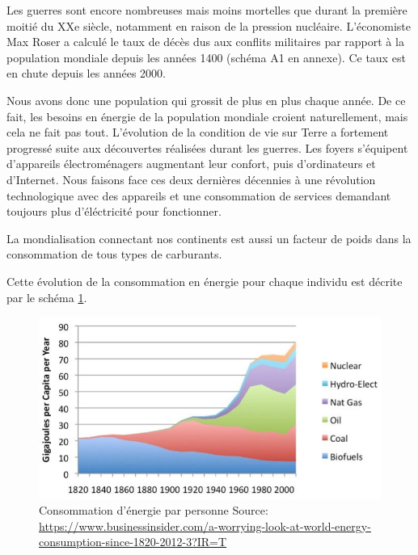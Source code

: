 Les guerres sont encore nombreuses mais moins mortelles que durant la première moitié du XXe siècle,
notamment en raison de la pression nucléaire. L'économiste Max Roser a calculé le taux de décès dus aux
conflits militaires par rapport à la population mondiale depuis les années 1400 (schéma A1 en annexe).
Ce taux est en chute depuis les années 2000.


Nous avons donc une population qui grossit de plus en plus chaque année.
De ce fait, les besoins en énergie de la population mondiale croient naturellement, mais cela ne fait pas tout.
L'évolution de la condition de vie sur Terre a fortement progressé suite aux découvertes réalisées durant les guerres.
Les foyers s'équipent d'appareils électroménagers augmentant leur confort, puis d'ordinateurs et d'Internet.
Nous faisons face ces deux dernières décennies à une révolution technologique avec des appareils et une consommation de services
demandant toujours plus d'éléctricité pour fonctionner.

La mondialisation connectant nos continents est aussi un facteur de poids dans la consommation de tous types de carburants.

Cette évolution de la consommation en énergie pour chaque individu est décrite par le schéma \ref{fig:capita_energy}.

\begin{figure}
  \centering
  \includegraphics[scale=0.35]{media/world_per_capita_energy.jpeg}
  \caption{
      Consommation d'énergie par personne\newline
      \tiny{Source:\newline
        \url{https://www.businessinsider.com/a-worrying-look-at-world-energy-consumption-since-1820-2012-3?IR=T}
      }
  }
  \label{fig:capita_energy}
\end{figure}


